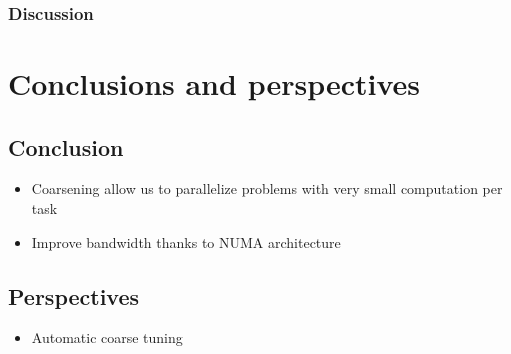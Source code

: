 \documentclass[oneside,12t]{classes/Thesis}
\begin{document}
\subsection{Discussion}




\chapter{Conclusions and perspectives}
\minitoc
\vspace{1cm}
\section{Conclusion}
  \begin{itemize}
    \item Coarsening allow us to parallelize problems with very small computation per task
    \item Improve bandwidth thanks to NUMA architecture
  \end{itemize}


\section{Perspectives}
  \begin{itemize}
    \item Automatic coarse tuning
  \end{itemize}



\backmatter %
%
%
\appendix



\end{document}
